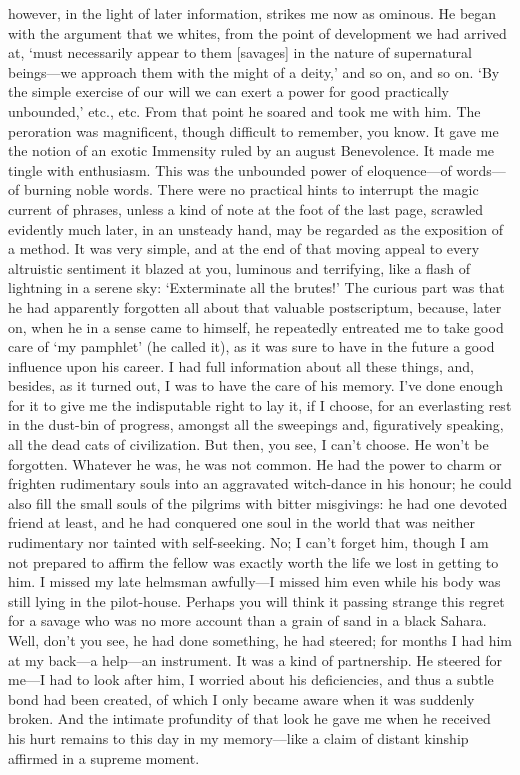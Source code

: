 \documentclass[12pt]{report}
\begin{document}
however, in the light of later information, strikes me now as ominous.
He began with the argument that we whites, from the point of development
we had arrived at, `must necessarily appear to them {[}savages{]} in the
nature of supernatural beings---we approach them with the might of a
deity,' and so on, and so on. `By the simple exercise of our will we can
exert a power for good practically unbounded,' etc., etc. From that
point he soared and took me with him. The peroration was magnificent,
though difficult to remember, you know. It gave me the notion of an
exotic Immensity ruled by an august Benevolence. It made me tingle with
enthusiasm. This was the unbounded power of eloquence---of words---of
burning noble words. There were no practical hints to interrupt the
magic current of phrases, unless a kind of note at the foot of the last
page, scrawled evidently much later, in an unsteady hand, may be
regarded as the exposition of a method. It was very simple, and at the
end of that moving appeal to every altruistic sentiment it blazed at
you, luminous and terrifying, like a flash of lightning in a serene sky:
`Exterminate all the brutes!' The curious part was that he had
apparently forgotten all about that valuable postscriptum, because,
later on, when he in a sense came to himself, he repeatedly entreated me
to take good care of `my pamphlet' (he called it), as it was sure to
have in the future a good influence upon his career. I had full
information about all these things, and, besides, as it turned out, I
was to have the care of his memory. I've done enough for it to give me
the indisputable right to lay it, if I choose, for an everlasting rest
in the dust-bin of progress, amongst all the sweepings and, figuratively
speaking, all the dead cats of civilization. But then, you see, I can't
choose. He won't be forgotten. Whatever he was, he was not common. He
had the power to charm or frighten rudimentary souls into an aggravated
witch-dance in his honour; he could also fill the small souls of the
pilgrims with bitter misgivings: he had one devoted friend at least, and
he had conquered one soul in the world that was neither rudimentary nor
tainted with self-seeking. No; I can't forget him, though I am not
prepared to affirm the fellow was exactly worth the life we lost in
getting to him. I missed my late helmsman awfully---I missed him even
while his body was still lying in the pilot-house. Perhaps you will
think it passing strange this regret for a savage who was no more
account than a grain of sand in a black Sahara. Well, don't you see, he
had done something, he had steered; for months I had him at my back---a
help---an instrument. It was a kind of partnership. He steered for
me---I had to look after him, I worried about his deficiencies, and thus
a subtle bond had been created, of which I only became aware when it was
suddenly broken. And the intimate profundity of that look he gave me
when he received his hurt remains to this day in my memory---like a
claim of distant kinship affirmed in a supreme moment.
\end{document}

